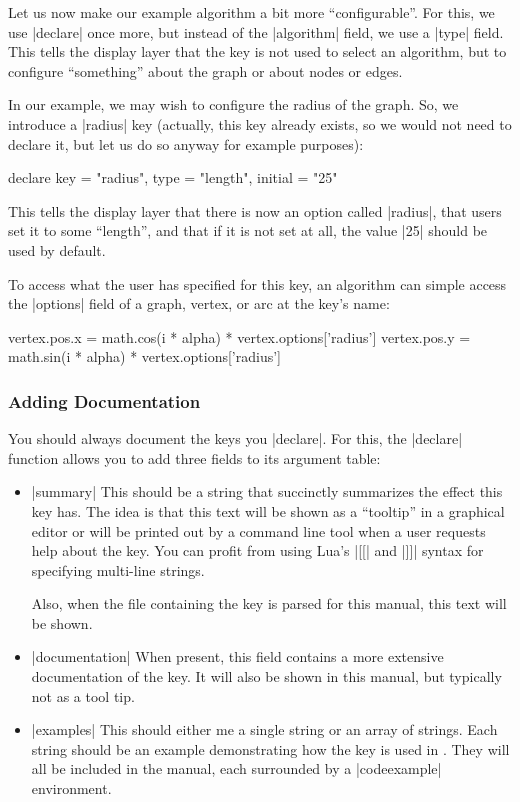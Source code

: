 Let us now make our example algorithm a bit more ``configurable''. For
this, we use |declare| once more, but instead of the |algorithm|
field, we use a |type| field. This tells the display layer that the
key is not used to select an algorithm, but to configure ``something''
about the graph or about nodes or edges.

In our example, we may wish to configure the radius of the graph. So,
we introduce a |radius| key (actually, this key already exists, so we
would not need to declare it, but let us do so anyway for example
purposes):

\begin{codeexample}
declare {
  key = "radius",
  type = "length",
  initial = "25"
}
\end{codeexample}

This tells the display layer that there is now an option called
|radius|, that users set it to some ``length'', and that if it is not
set at all, the value |25| should be used by default.

To access what the user has specified for this key, an algorithm can
simple access the |options| field of a graph, vertex, or arc at the
key's name:

\begin{codeexample}
          vertex.pos.x = math.cos(i * alpha) * vertex.options['radius']
          vertex.pos.y = math.sin(i * alpha) * vertex.options['radius']
\end{codeexample}



\subsubsection{Adding Documentation}

You should always document the keys you |declare|. For this, the
|declare| function allows you to add three fields to its argument
table:
\begin{itemize}
\item |summary| This should be a string that succinctly summarizes the
  effect this key has. The idea is that this text will be shown as a
  ``tooltip'' in a graphical editor or will be printed out by a
  command line tool when a user requests help about the key.
  You can profit from using Lua's |[[| and |]]| syntax for specifying
  multi-line strings.
  
  Also, when the file containing the key is parsed for
  this manual, this text will be shown.
\item |documentation| When present, this field contains a more
  extensive documentation of the key. It will also be shown in this
  manual, but typically not as a tool tip.
\item |examples| This should either me a single string or an array of
  strings. Each string should be an example demonstrating how the key
  is used in \tikzname. They will all be included in the manual, each
  surrounded by a |codeexample| environment.
\end{itemize}

